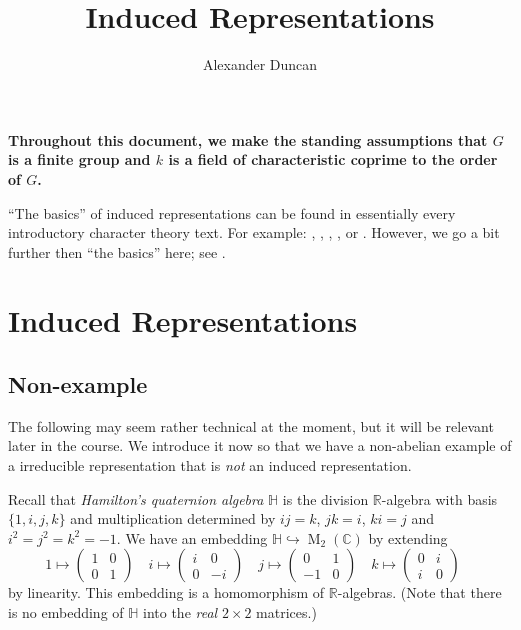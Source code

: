 \documentclass[12pt]{article}
\theoremstyle{plain}
\theoremstyle{definition}
\theoremstyle{remark}
\numberwithin{equation}{section}
\begin{document}
\title{Induced Representations}
\author{Alexander Duncan}

\maketitle

{\bf
Throughout this document, we make the standing assumptions that $G$
is a finite group and $k$ is a field of characteristic coprime to the
order of $G$.}

``The basics'' of induced representations can be found in essentially
every introductory character theory text.  For example:
\cite[\S{16}]{AlperinBell},
\cite[\S{5.8-5.11}]{Etingof},
\cite[\S{3.3}]{FultonHarris},
\cite[\S{XVIII.6--9}]{Lang}, or
\cite[\S{3.3}]{Serre}.
However, we go a bit further then ``the basics'' here;
see \cite[\S{7--10}]{Serre}.


\section{Induced Representations}

\subsection{Non-example}

The following may seem rather technical at the moment, but it will be
relevant later in the course.  We introduce it now so that we have a
non-abelian example of a irreducible representation that is
\emph{not} an induced representation.

Recall that \emph{Hamilton's quaternion algebra} $\mathbb{H}$
is the division $\mathbb{R}$-algebra
with basis $\{1,i,j,k\}$ and multiplication determined by
$ij=k$, $jk=i$, $ki=j$ and $i^2=j^2=k^2=-1$.
We have an embedding
$\mathbb{H} \hookrightarrow \operatorname{M}_2(\mathbb{C})$
by extending
\[
1 \mapsto \begin{pmatrix} 1&0\\0&1 \end{pmatrix} \quad
i \mapsto \begin{pmatrix} i&0\\0&-i \end{pmatrix} \quad
j \mapsto \begin{pmatrix} 0&1\\-1&0 \end{pmatrix} \quad
k \mapsto \begin{pmatrix} 0&i\\i&0 \end{pmatrix} \quad
\]
by linearity.
This embedding is a homomorphism of $\mathbb{R}$-algebras.
(Note that there is no embedding of $\mathbb{H}$ into
the \emph{real} $2\times 2$ matrices.)
\end{document}
